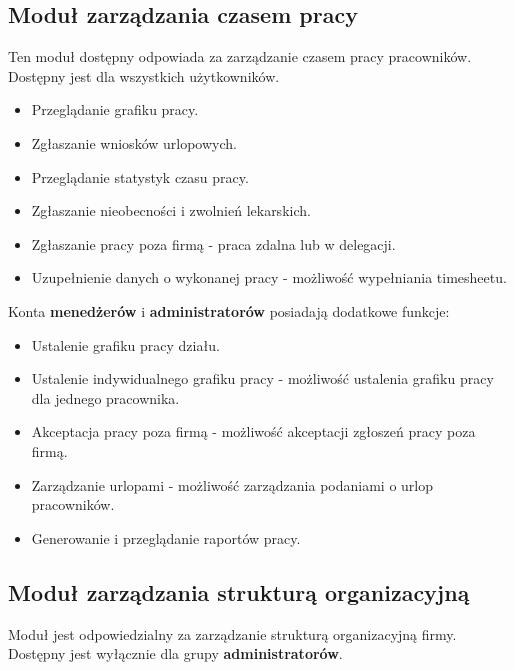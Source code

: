 \subsection{Moduł zarządzania czasem pracy}

Ten moduł dostępny odpowiada za zarządzanie czasem pracy pracowników. Dostępny jest dla wszystkich użytkowników.

\begin{itemize}
    \item {Przeglądanie grafiku pracy}.
    \item {Zgłaszanie wniosków urlopowych}.
    \item {Przeglądanie statystyk czasu pracy}.
    \item {Zgłaszanie nieobecności i zwolnień lekarskich}.
    \item {Zgłaszanie pracy poza firmą} - praca zdalna lub w delegacji.
    \item {Uzupełnienie danych o wykonanej pracy} - możliwość wypełniania timesheetu.
\end{itemize}

\noindent
Konta \textbf{menedżerów} i \textbf{administratorów} posiadają dodatkowe funkcje:

\begin{itemize}
    \item {Ustalenie grafiku pracy działu}.
    \item {Ustalenie indywidualnego grafiku pracy} - możliwość ustalenia grafiku pracy dla jednego pracownika.
    \item {Akceptacja pracy poza firmą} - możliwość akceptacji zgłoszeń pracy poza firmą.
    \item {Zarządzanie urlopami} - możliwość zarządzania podaniami o urlop pracowników.
    \item {Generowanie i przeglądanie raportów pracy}.
\end{itemize}

\subsection{Moduł zarządzania strukturą organizacyjną}

Moduł jest odpowiedzialny za zarządzanie strukturą organizacyjną firmy. Dostępny jest wyłącznie dla grupy \textbf{administratorów}.

